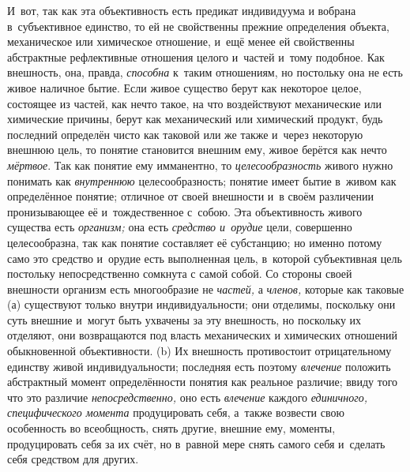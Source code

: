 И~вот, так как эта объективность есть предикат индивидуума и
вобрана в~субъективное единство, то ей не свойственны прежние определения
объекта, механическое или химическое отношение, и~ещё менее ей свойственны
абстрактные рефлективные отношения целого и~частей и~тому подобное. Как
внешность, она, правда, {\em способна}
к~таким отношениям, но постольку она не есть живое наличное
бытие. Если живое существо берут как некоторое целое, состоящее из частей,
как нечто такое, на что воздействуют механические или химические причины,
берут как механический или химический продукт, будь последний определён
чисто как таковой или же также и~через некоторую внешнюю
цель, то понятие становится внешним ему, живое берётся как нечто
{\em мёртвое}. Так как
понятие ему имманентно, то
{\em целесообразность}
живого нужно понимать как
{\em внутреннюю}
целесообразность; понятие имеет бытие в~живом как
определённое понятие; отличное от своей внешности и~в своём различении
пронизывающее её и~тождественное с~собою. Эта объективность живого существа
есть {\em организм;} она есть {\em средство и~орудие}
цели, совершенно целесообразна, так как понятие составляет её
субстанцию; но именно потому само это средство и~орудие есть выполненная
цель, в~которой субъективная цель постольку непосредственно сомкнута с
самой собой. Со стороны своей внешности организм есть многообразие не
{\em частей,} а
{\em членов,} которые как
таковые (а) существуют только внутри индивидуальности; они отделимы,
поскольку они суть внешние и~могут быть ухвачены за эту внешность, но
поскольку их отделяют, они возвращаются под власть механических и
химических отношений обыкновенной объективности. (b) Их внешность
противостоит отрицательному единству живой индивидуальности; последняя есть
поэтому {\em влечение}
положить абстрактный момент определённости понятия как
реальное различие; ввиду того что это различие
{\em непосредственно,}
оно есть {\em влечение}
каждого {\em единичного,}
{\em специфического момента}
продуцировать себя, а~также возвести свою особенность во
всеобщность, снять другие, внешние ему, моменты, продуцировать себя за их
счёт, но в~равной мере снять самого себя и~сделать себя средством для
других.

